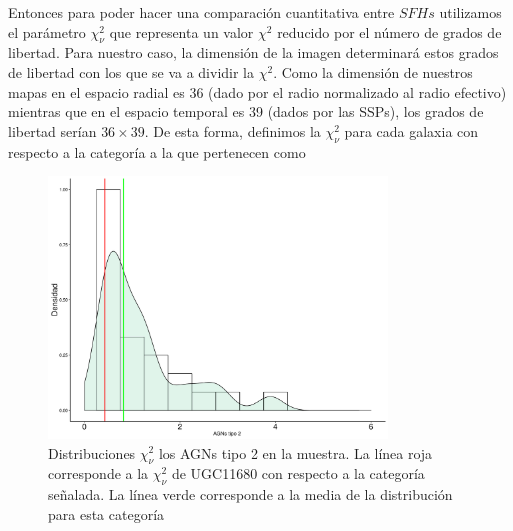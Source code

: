 \bigskip


\noindent Entonces para poder hacer una comparación cuantitativa entre $SFHs$ utilizamos el parámetro $\chi^{2}_{\nu}$ que representa un valor $\chi^{2}$ reducido por el número de grados de libertad. Para nuestro caso, la dimensión de la imagen determinará estos grados de libertad con los que se va a dividir la $\chi^{2}$. Como la dimensión de nuestros mapas en el espacio radial es 36 (dado por el radio normalizado al radio efectivo) mientras que en el espacio temporal es 39 (dados por las SSPs), los grados de libertad serían  $36 \times 39$. De esta forma, definimos la $\chi^{2}_{\nu}$ para cada galaxia con respecto a la categoría a la que pertenecen como




\begin{figure}[htbp]
\centering
\includegraphics[width=90mm]{chi_agns.pdf}
\caption[Distribuciones $\chi^2_{\nu}$ para AGNs tipo 2] {Distribuciones $\chi^{2}_{\nu}$ los AGNs tipo 2 en la muestra. La línea roja corresponde a la $\chi^{2}_{\nu}$ de UGC11680 con respecto a la categoría señalada. La línea verde corresponde a la media de la distribución para esta categoría}
\label{ensamblaje_cara}
\end{figure}


